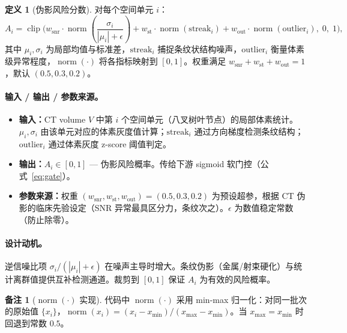 \documentclass[11pt,a4paper]{article}
\newcommand{\clip}{\operatorname{clip}}
\newcommand{\normop}{\operatorname{norm}}
\theoremstyle{definition}
\newtheorem{definition}{定义}[section]
\newtheorem{remark}{备注}[section]
\begin{document}
\begin{definition}[伪影风险分数]
对每个空间单元 $i$：
\begin{equation}\label{eq:artifact}
A_i = \clip\!\Bigg(
    w_{\mathrm{snr}} \cdot \normop\!\!\left(\frac{\sigma_i}{|\mu_i|+\epsilon}\right)
    + w_{\mathrm{st}} \cdot \normop(\mathrm{streak}_i)
    + w_{\mathrm{out}} \cdot \normop(\mathrm{outlier}_i),\;0,\;1
\Bigg),
\end{equation}
其中 $\mu_i, \sigma_i$ 为局部均值与标准差，$\mathrm{streak}_i$ 捕捉条纹状结构噪声，$\mathrm{outlier}_i$ 衡量体素级异常程度，$\normop(\cdot)$ 将各指标映射到 $[0,1]$。权重满足 $w_{\mathrm{snr}} + w_{\mathrm{st}} + w_{\mathrm{out}} = 1$，默认 $(0.5, 0.3, 0.2)$。
\end{definition}

\paragraph{输入 / 输出 / 参数来源。}
\begin{itemize}[nosep]
    \item \textbf{输入：}CT volume $V$ 中第 $i$ 个空间单元（八叉树叶节点）的局部体素统计。$\mu_i, \sigma_i$ 由该单元对应的体素灰度值计算；$\mathrm{streak}_i$ 通过方向梯度检测条纹结构；$\mathrm{outlier}_i$ 通过体素灰度 z-score 阈值判定。
    \item \textbf{输出：}$A_i \in [0,1]$ — 伪影风险概率。传给下游 sigmoid 软门控（公式~\ref{eq:gate}）。
    \item \textbf{参数来源：}权重 $(w_{\mathrm{snr}}, w_{\mathrm{st}}, w_{\mathrm{out}}) = (0.5, 0.3, 0.2)$ 为预设超参，根据 CT 伪影的临床先验设定（SNR 异常最具区分力，条纹次之）。$\epsilon$ 为数值稳定常数（防止除零）。
\end{itemize}

\paragraph{设计动机。}
逆信噪比项 $\sigma_i/(|\mu_i|+\epsilon)$ 在噪声主导时增大。条纹伪影（金属/射束硬化）与统计离群值提供互补检测通道。裁剪到 $[0,1]$ 保证 $A_i$ 为有效的风险概率。

\begin{remark}[$\normop(\cdot)$ 实现]
代码中 $\normop(\cdot)$ 采用 min-max 归一化：对同一批次的原始值 $\{x_i\}$，$\normop(x_i) = (x_i - x_{\min}) / (x_{\max} - x_{\min})$。当 $x_{\max} = x_{\min}$ 时回退到常数 $0.5$。
\end{remark}
\end{document}
